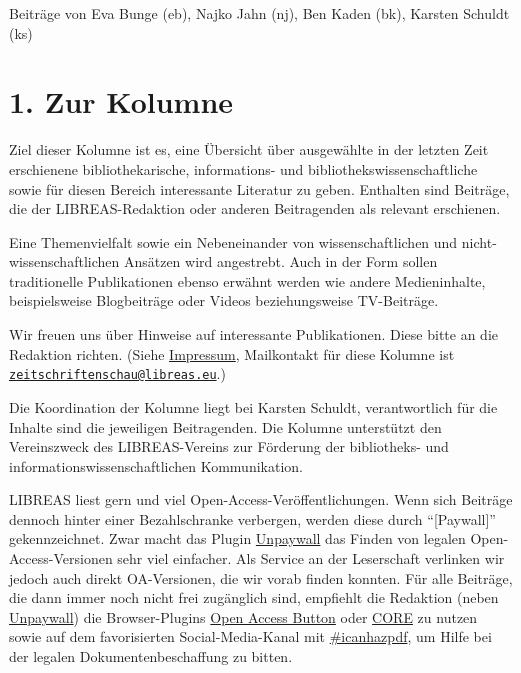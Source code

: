 \documentclass[a4paper,
fontsize=11pt,
oneside,
numbers=noperiodatend,
parskip=half-,
bibliography=totoc,
final
]{scrartcl}
\title{\LARGE{Das liest die LIBREAS, Nummer #16 (Fühling–Sommer 2025)}}%
\author{Redaktion LIBREAS} %
\date{}
\begin{document}
\maketitle
\thispagestyle{fancyplain} 


Beiträge von Eva Bunge (eb), Najko Jahn (nj), Ben Kaden (bk), Karsten
Schuldt (ks)

\section{1. Zur Kolumne}\label{zur-kolumne}

Ziel dieser Kolumne ist es, eine Übersicht über ausgewählte in der
letzten Zeit erschienene bibliothekarische, informations- und
bibliothekswissenschaftliche sowie für diesen Bereich interessante
Literatur zu geben. Enthalten sind Beiträge, die der LIBREAS-Redaktion
oder anderen Beitragenden als relevant erschienen.

Eine Themenvielfalt sowie ein Nebeneinander von wissenschaftlichen und
nicht-wissenschaftlichen Ansätzen wird angestrebt. Auch in der Form
sollen traditionelle Publikationen ebenso erwähnt werden wie andere
Medieninhalte, beispielsweise Blogbeiträge oder Videos beziehungsweise
TV-Beiträge.

Wir freuen uns über Hinweise auf interessante Publikationen. Diese bitte
an die Redaktion richten. (Siehe
\href{http://libreas.eu/about/}{Impressum}, Mailkontakt für diese
Kolumne ist
\href{mailto:zeitschriftenschau@libreas.eu}{\nolinkurl{zeitschriftenschau@libreas.eu}}.)

Die Koordination der Kolumne liegt bei Karsten Schuldt, verantwortlich
für die Inhalte sind die jeweiligen Beitragenden. Die Kolumne
unterstützt den Vereinszweck des LIBREAS-Vereins zur Förderung der
bibliotheks- und informationswissenschaftlichen Kommunikation.

LIBREAS liest gern und viel Open-Access-Veröffentlichungen. Wenn sich
Beiträge dennoch hinter einer Bezahlschranke verbergen, werden diese
durch \enquote{{[}Paywall{]}} gekennzeichnet. Zwar macht das Plugin
\href{http://unpaywall.org/}{Unpaywall} das Finden von legalen
Open-Access-Versionen sehr viel einfacher. Als Service an der
Leserschaft verlinken wir jedoch auch direkt OA-Versionen, die wir vorab
finden konnten. Für alle Beiträge, die dann immer noch nicht frei
zugänglich sind, empfiehlt die Redaktion (neben
\href{http://unpaywall.org/}{Unpaywall}) die Browser-Plugins
\href{https://openaccessbutton.org/}{Open Access Button} oder
\href{https://core.ac.uk/services/discovery/}{CORE} zu nutzen sowie auf
dem favorisierten Social-Media-Kanal mit
\href{https://mastodon.social/tags/icanhazpdf}{\#icanhazpdf}, um Hilfe
bei der legalen Dokumentenbeschaffung zu bitten.
\end{document}
